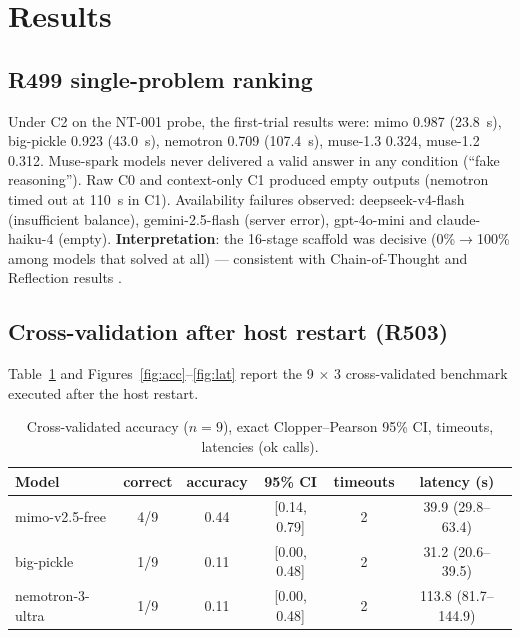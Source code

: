 \section{Results}
\label{sec:results}

\subsection{R499 single-problem ranking}
\label{sec:r499}
Under C2 on the NT-001 probe, the first-trial results were: mimo 0.987
(23.8~s), big-pickle 0.923 (43.0~s), nemotron 0.709 (107.4~s), muse-1.3
0.324, muse-1.2 0.312. Muse-spark models never delivered a valid answer in
any condition (``fake reasoning''). Raw C0 and context-only C1 produced empty
outputs (nemotron timed out at 110~s in C1). Availability failures observed:
deepseek-v4-flash (insufficient balance), gemini-2.5-flash (server error),
gpt-4o-mini and claude-haiku-4 (empty). \textbf{Interpretation}: the 16-stage
scaffold was decisive (0\%$\rightarrow$100\% among models that solved at all)
--- consistent with Chain-of-Thought and Reflection results
\citep{wei_cot,shinn_reflexion}.

\subsection{Cross-validation after host restart (R503)}
\label{sec:r503}
Table~\ref{tab:acc} and Figures~\ref{fig:acc}--\ref{fig:lat} report the
9 $\times$ 3 cross-validated benchmark executed after the host restart.

\begin{table}[htbp]
\centering
\caption{Cross-validated accuracy ($n=9$), exact Clopper--Pearson 95\% CI,
timeouts, latencies (ok calls).}
\label{tab:acc}
\begin{tabular}{lccccc}
\toprule
Model & correct & accuracy & 95\% CI & timeouts & latency (s) \\
\midrule
mimo-v2.5-free    & 4/9 & 0.44 & [0.14, 0.79] & 2 & 39.9 (29.8--63.4) \\
big-pickle        & 1/9 & 0.11 & [0.00, 0.48] & 2 & 31.2 (20.6--39.5) \\
nemotron-3-ultra  & 1/9 & 0.11 & [0.00, 0.48] & 2 & 113.8 (81.7--144.9) \\
\bottomrule
\end{tabular}
\end{table}

